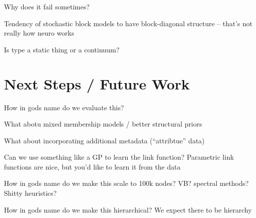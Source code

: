 \documentclass{article}
\begin{document}
Why does it fail sometimes? 

Tendency of stochastic block models to have block-diagonal structure -- that's not really how neuro works

Is type a static thing or a continuum? 


\section{Next Steps / Future Work}
How in gods name do we evaluate this? 

What abotu mixed membership models / better structural priors

What about incorporating additional metadata (``attribtue'' data)

Can we use something like a GP to learn the link function? 
Parametric link functions are nice, but you'd like to learn it from the data

How in gods name do we make this scale to 100k nodes? 
VB? spectral methods? Shitty heuristics? 

How in gods name do we make this hierarchical? 
We expect there to be hierarchy 
\end{document}
